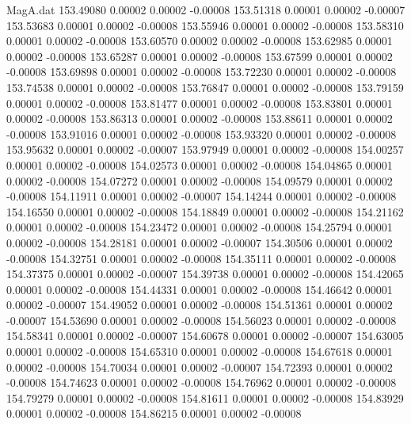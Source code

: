 \begin{filecontents}{MagA.dat}
 153.49080    0.00002    0.00002   -0.00008
 153.51318    0.00001    0.00002   -0.00007
 153.53683    0.00001    0.00002   -0.00008
 153.55946    0.00001    0.00002   -0.00008
 153.58310    0.00001    0.00002   -0.00008
 153.60570    0.00002    0.00002   -0.00008
 153.62985    0.00001    0.00002   -0.00008
 153.65287    0.00001    0.00002   -0.00008
 153.67599    0.00001    0.00002   -0.00008
 153.69898    0.00001    0.00002   -0.00008
 153.72230    0.00001    0.00002   -0.00008
 153.74538    0.00001    0.00002   -0.00008
 153.76847    0.00001    0.00002   -0.00008
 153.79159    0.00001    0.00002   -0.00008
 153.81477    0.00001    0.00002   -0.00008
 153.83801    0.00001    0.00002   -0.00008
 153.86313    0.00001    0.00002   -0.00008
 153.88611    0.00001    0.00002   -0.00008
 153.91016    0.00001    0.00002   -0.00008
 153.93320    0.00001    0.00002   -0.00008
 153.95632    0.00001    0.00002   -0.00007
 153.97949    0.00001    0.00002   -0.00008
 154.00257    0.00001    0.00002   -0.00008
 154.02573    0.00001    0.00002   -0.00008
 154.04865    0.00001    0.00002   -0.00008
 154.07272    0.00001    0.00002   -0.00008
 154.09579    0.00001    0.00002   -0.00008
 154.11911    0.00001    0.00002   -0.00007
 154.14244    0.00001    0.00002   -0.00008
 154.16550    0.00001    0.00002   -0.00008
 154.18849    0.00001    0.00002   -0.00008
 154.21162    0.00001    0.00002   -0.00008
 154.23472    0.00001    0.00002   -0.00008
 154.25794    0.00001    0.00002   -0.00008
 154.28181    0.00001    0.00002   -0.00007
 154.30506    0.00001    0.00002   -0.00008
 154.32751    0.00001    0.00002   -0.00008
 154.35111    0.00001    0.00002   -0.00008
 154.37375    0.00001    0.00002   -0.00007
 154.39738    0.00001    0.00002   -0.00008
 154.42065    0.00001    0.00002   -0.00008
 154.44331    0.00001    0.00002   -0.00008
 154.46642    0.00001    0.00002   -0.00007
 154.49052    0.00001    0.00002   -0.00008
 154.51361    0.00001    0.00002   -0.00007
 154.53690    0.00001    0.00002   -0.00008
 154.56023    0.00001    0.00002   -0.00008
 154.58341    0.00001    0.00002   -0.00007
 154.60678    0.00001    0.00002   -0.00007
 154.63005    0.00001    0.00002   -0.00008
 154.65310    0.00001    0.00002   -0.00008
 154.67618    0.00001    0.00002   -0.00008
 154.70034    0.00001    0.00002   -0.00007
 154.72393    0.00001    0.00002   -0.00008
 154.74623    0.00001    0.00002   -0.00008
 154.76962    0.00001    0.00002   -0.00008
 154.79279    0.00001    0.00002   -0.00008
 154.81611    0.00001    0.00002   -0.00008
 154.83929    0.00001    0.00002   -0.00008
 154.86215    0.00001    0.00002   -0.00008

\end{filecontents}
